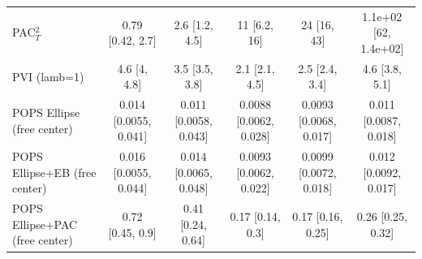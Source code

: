 \begin{tabular}{lccccc}
PAC$^2_T$ & 0.79 {\scriptsize[0.42, 2.7]} & 2.6 {\scriptsize[1.2, 4.5]} & 11 {\scriptsize[6.2, 16]} & 24 {\scriptsize[16, 43]} & 1.1e+02 {\scriptsize[62, 1.4e+02]} \\
PVI (lamb=1) & 4.6 {\scriptsize[4, 4.8]} & 3.5 {\scriptsize[3.5, 3.8]} & 2.1 {\scriptsize[2.1, 4.5]} & 2.5 {\scriptsize[2.4, 3.4]} & 4.6 {\scriptsize[3.8, 5.1]} \\
POPS Ellipse (free center) & 0.014 {\scriptsize[0.0055, 0.041]} & 0.011 {\scriptsize[0.0058, 0.043]} & 0.0088 {\scriptsize[0.0062, 0.028]} & 0.0093 {\scriptsize[0.0068, 0.017]} & 0.011 {\scriptsize[0.0087, 0.018]} \\
POPS Ellipse+EB (free center) & 0.016 {\scriptsize[0.0055, 0.044]} & 0.014 {\scriptsize[0.0065, 0.048]} & 0.0093 {\scriptsize[0.0062, 0.022]} & 0.0099 {\scriptsize[0.0072, 0.018]} & 0.012 {\scriptsize[0.0092, 0.017]} \\
POPS Ellipse+PAC (free center) & 0.72 {\scriptsize[0.45, 0.9]} & 0.41 {\scriptsize[0.24, 0.64]} & 0.17 {\scriptsize[0.14, 0.3]} & 0.17 {\scriptsize[0.16, 0.25]} & 0.26 {\scriptsize[0.25, 0.32]} \\
\bottomrule
\end{tabular}

